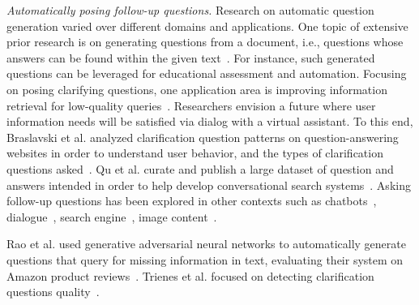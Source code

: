 \noindent
{\em Automatically posing follow-up questions.} Research on automatic question generation varied over different domains and applications. One topic of extensive prior research is on generating questions from a document, i.e., questions whose answers can be found within the given text~\cite{vanderwende2008importance,rus2011question,zhou2017neural,heilman2010good,duan2017question,du2017learning}. For instance, such generated questions can be leveraged for educational assessment and automation. Focusing on posing clarifying questions, one application area is improving information retrieval for low-quality queries~\cite{10.1145/3366423.3380126,10.1145/3331184.3331265,stoyanchev2014towards}. Researchers envision a future where user information needs will be satisfied via dialog with a virtual assistant.
To this end, Braslavski et al. analyzed clarification question patterns on question-answering websites in order to understand user behavior, and the types of clarification questions asked~\cite{10.1145/3020165.3022149}.
Qu et al. curate and publish a large dataset of question and answers intended in order to help develop conversational search systems~\cite{10.1145/3209978.3210124}. Asking follow-up questions has been explored in other contexts such as chatbots~\cite{Hancock2019LearningFD}, dialogue~\cite{de2005implementing, de2003analysis}, search engine~\cite{Ren2020ConversationsWS}, image content~\cite{Mostafazadeh_2016}.


Rao et al. used generative adversarial neural networks to automatically generate questions that query for missing information in text, evaluating their system on Amazon product reviews~\cite{rao-daume-iii-2018-learning}. Trienes et al. focused on detecting clarification questions quality~\cite{trienes2019identifying}.
